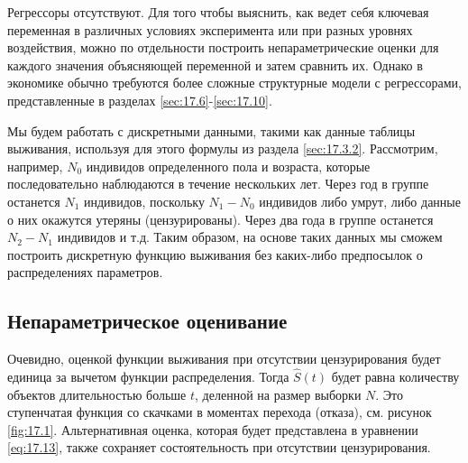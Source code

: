 Регрессоры отсутствуют. Для того чтобы выяснить, как ведет себя ключевая переменная в различных условиях эксперимента или при разных уровнях воздействия,
можно по отдельности построить непараметрические оценки для каждого значения объясняющей переменной и затем сравнить их. Однако в экономике обычно требуются более сложные структурные модели с регрессорами, представленные в разделах \ref{sec:17.6}-\ref{sec:17.10}.

Мы будем работать с дискретными данными, такими как данные таблицы выживания, используя для этого формулы из раздела \ref{sec:17.3.2}.
Рассмотрим, например, $N_0$ индивидов определенного пола и возраста, которые последовательно наблюдаются в течение нескольких лет. Через год в группе останется $N_1$ индивидов, поскольку $N_1-N_0$ индивидов либо умрут, либо данные о них окажутся утеряны (цензурированы). Через два года в группе останется $N_2-N_1$ индивидов и т.д. Таким образом, на основе таких данных мы сможем построить дискретную функцию выживания без каких-либо предпосылок о распределениях параметров.


\subsection{Непараметрическое оценивание}\label{sec:17.5.1}

\noindent
Очевидно, оценкой функции выживания при отсутствии цензурирования будет единица за вычетом функции распределения. Тогда $\hat{S}(t)$ будет равна количеству объектов длительностью больше $t$, деленной на размер выборки $N$. Это ступенчатая функция со скачками в моментах перехода (отказа), см. рисунок \ref{fig:17.1}.
Альтернативная оценка, которая будет представлена в уравнении \ref{eq:17.13}, также сохраняет состоятельность при отсутствии цензурирования.

